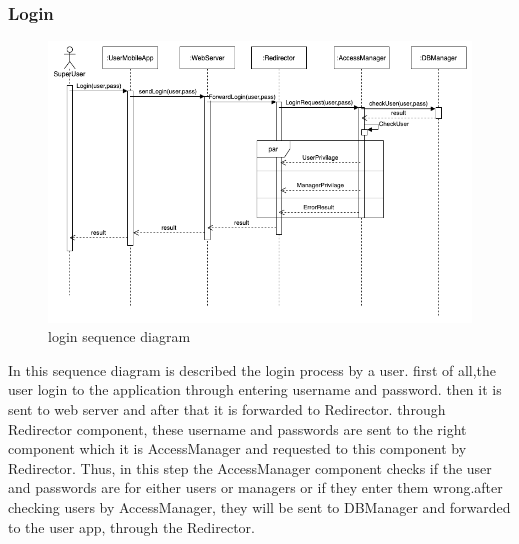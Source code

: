 \vspace{1cm}

\subsubsection{Login}
\begin{figure}[H]
  \centering
  \includegraphics[width=\textwidth, keepaspectratio]{images/sequences/Login.png}
  \caption{login sequence diagram}
\end{figure}
\vspace{2cm}
In this sequence diagram is described the login process by a user.
first of all,the user login to the application through entering username and password. then it is sent to web server and after that it is forwarded to Redirector. through Redirector component, these username and passwords are sent to the right component which it is AccessManager and requested to this component by Redirector. Thus, in this step the AccessManager component checks if the user and passwords are for either users or managers or if they enter them wrong.after checking users by AccessManager, they will be sent to DBManager and forwarded to the user app, through the Redirector.

